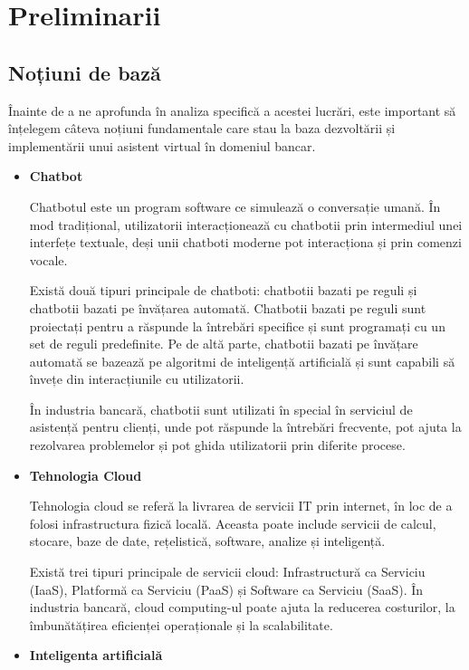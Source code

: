 \chapter{Preliminarii}

\section{Noțiuni de bază}

Înainte de a ne aprofunda în analiza specifică a acestei lucrări, este important să înțelegem câteva noțiuni fundamentale care stau la baza dezvoltării și implementării unui asistent virtual în domeniul bancar.

\begin{itemize}
    \item \textbf{Chatbot} 

Chatbotul este un program software ce simulează o conversație umană. În mod tradițional, utilizatorii interacționează cu chatbotii prin intermediul unei interfețe textuale, deși unii chatboti moderne pot interacționa și prin comenzi vocale.

Există două tipuri principale de chatboti: chatbotii bazati pe reguli și chatbotii bazati pe învățarea automată. Chatbotii bazati pe reguli sunt proiectați pentru a răspunde la întrebări specifice și sunt programați cu un set de reguli predefinite. Pe de altă parte, chatbotii bazati pe învățare automată se bazează pe algoritmi de inteligență artificială și sunt capabili să învețe din interacțiunile cu utilizatorii.

În industria bancară, chatbotii sunt utilizati în special în serviciul de asistență pentru clienți, unde pot răspunde la întrebări frecvente, pot ajuta la rezolvarea problemelor și pot ghida utilizatorii prin diferite procese.

    \item \textbf{Tehnologia Cloud}

Tehnologia cloud se referă la livrarea de servicii IT prin internet, în loc de a folosi infrastructura fizică locală. Aceasta poate include servicii de calcul, stocare, baze de date, rețelistică, software, analize și inteligență.

Există trei tipuri principale de servicii cloud: Infrastructură ca Serviciu (IaaS), Platformă ca Serviciu (PaaS) și Software ca Serviciu (SaaS). În industria bancară, cloud computing-ul poate ajuta la reducerea costurilor, la îmbunătățirea eficienței operaționale și la scalabilitate.

    \item \textbf{Inteligenta artificială} 


\end{itemize}
